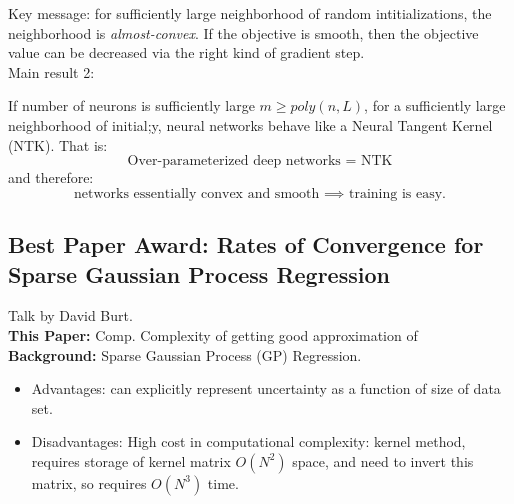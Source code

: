Key message: for sufficiently large neighborhood of random intitializations, the neighborhood is {\it almost-convex}. If the objective is smooth, then the objective value can be decreased via the right kind of gradient step. \\

Main result 2:
\begin{theorem}
If number of neurons is sufficiently large $m \geq poly(n,L)$, for a sufficiently large neighborhood of initial;y, neural networks behave like a Neural Tangent Kernel (NTK). That is:
\[
\text{Over-parameterized deep networks = NTK}
\]
and therefore:
\[
\text{networks essentially convex and smooth $\implies$ training is easy.}
\]
\end{theorem}


\spacerule








\spacerule


\subsection{Best Paper Award: Rates of Convergence for Sparse Gaussian Process Regression}

Talk by David Burt. \\

{\bf This Paper:} Comp. Complexity of getting good approximation of \\

{\bf Background:} Sparse Gaussian Process (GP) Regression. \\

\begin{itemize}
    \item Advantages: can explicitly represent uncertainty as a function of size of data set.
    \item Disadvantages: High cost in computational complexity: kernel method, requires storage of kernel matrix $O(N^2)$ space, and need to invert this matrix, so requires $O(N^3)$ time.
\end{itemize}


